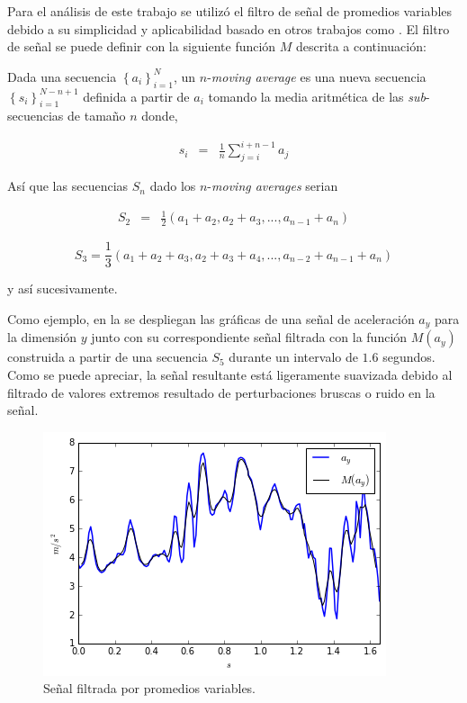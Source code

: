 Para el análisis de este trabajo se utilizó el filtro de señal de
promedios variables debido a su simplicidad y aplicabilidad basado
en otros trabajos como \cite{Yang2009}. El filtro de señal se puede
definir con la siguiente función $M$ descrita a continuación:

\begin{definition}\label{def4:moving-average}Dada
una secuencia $\left\{ a_{i}\right\} _{i=1}^{N}$, un $n$-\emph{moving
average} es una nueva secuencia $\left\{ s_{i}\right\} _{i=1}^{N-n+1}$
definida a partir de $a_{i}$ tomando la media aritmética de las \emph{sub}-secuencias
de tamaño $n$ donde,

\begin{eqnarray}
s_{i} & = & \frac{1}{n}\sum_{j=i}^{i+n-1}a_{j}
\end{eqnarray}

Así que las secuencias $S_{n}$ dado los $n$-\emph{moving averages}
serian 

\begin{eqnarray}
S_{2} & = & \frac{1}{2}(a_{1}+a_{2},a_{2}+a_{3},...,a_{n-1}+a_{n})
\end{eqnarray}

\begin{equation}
S_{3}=\frac{1}{3}(a_{1}+a_{2}+a_{3},a_{2}+a_{3}+a_{4},...,a_{n-2}+a_{n-1}+a_{n})
\end{equation}

y así sucesivamente.\end{definition}

Como ejemplo, en la  se despliegan las gráficas
de una señal de aceleración $a_{y}$ para la dimensión \textbf{$y$}
junto con su correspondiente señal filtrada con la función $M(a_{y})$
construida a partir de una secuencia $S_{5}$ durante un intervalo
de $1.6$ segundos. Como se puede apreciar, la señal resultante está
ligeramente suavizada debido al filtrado de valores extremos resultado
de perturbaciones bruscas o ruido en la señal.

\begin{figure}[!tbph]
\begin{centering}
\includegraphics{capitulo-4/graphics/moving_average}
\par\end{centering}
\caption[Señal filtrada por la función $M$]{\label{fig4:filter-maf}Señal filtrada por promedios variables.}
\end{figure}



